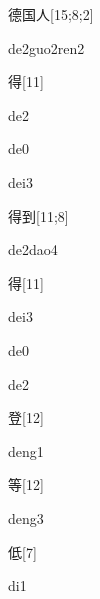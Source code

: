 \begin{verbete}{德国人}[15;8;2]
\begin{pronuncia}{de2guo2ren2}
\end{pronuncia}
\end{verbete}

\begin{verbete}[de2]{得}[11]
\begin{pronuncia}{de2}
\end{pronuncia}
\begin{pronuncia}{de0}
\end{pronuncia}
\begin{pronuncia}{dei3}
\end{pronuncia}
\end{verbete}

\begin{verbete}[de2dao4]{得到}[11;8]
\begin{pronuncia}{de2dao4}
\end{pronuncia}
\end{verbete}

\begin{verbete}[dei3]{得}[11]
\begin{pronuncia}{dei3}
\end{pronuncia}
\begin{pronuncia}{de0}
\end{pronuncia}
\begin{pronuncia}{de2}
\end{pronuncia}
\end{verbete}

\begin{verbete}[deng1]{登}[12]
\begin{pronuncia}{deng1}
\end{pronuncia}
\end{verbete}

\begin{verbete}[deng3]{等}[12]
\begin{pronuncia}{deng3}
\end{pronuncia}
\end{verbete}

\begin{verbete}[di1]{低}[7]
\begin{pronuncia}{di1}
\end{pronuncia}
\end{verbete}

